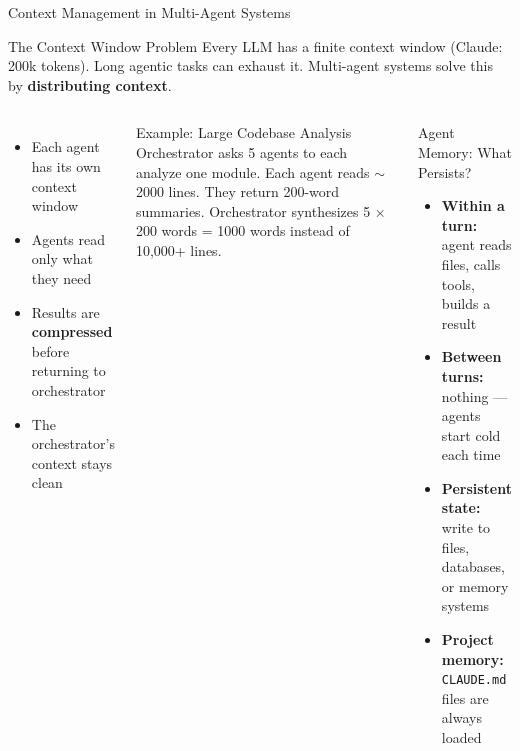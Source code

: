 \documentclass[aspectratio=169,xcolor=dvipsnames]{beamer}
\begin{document}
\begin{frame}{Context Management in Multi-Agent Systems}
    \begin{block}{The Context Window Problem}
        Every LLM has a finite context window (Claude: 200k tokens). Long agentic tasks can exhaust it. Multi-agent systems solve this by \textbf{distributing context}.
    \end{block}

    \begin{columns}
        \begin{itemize}
            \item Each agent has its own context window
            \item Agents read only what they need
            \item Results are \textbf{compressed} before returning to orchestrator
            \item The orchestrator's context stays clean
        \end{itemize}
        \vspace{0.2cm}
        \begin{exampleblock}{Example: Large Codebase Analysis}
            Orchestrator asks 5 agents to each analyze one module. Each agent reads $\sim$2000 lines. They return 200-word summaries. Orchestrator synthesizes 5 × 200 words = 1000 words instead of 10,000+ lines.
        \end{exampleblock}

        \begin{alertblock}{Agent Memory: What Persists?}
            \begin{itemize}
                \item \textbf{Within a turn:} agent reads files, calls tools, builds a result
                \item \textbf{Between turns:} nothing --- agents start cold each time
                \item \textbf{Persistent state:} write to files, databases, or memory systems
                \item \textbf{Project memory:} \texttt{CLAUDE.md} files are always loaded
            \end{itemize}
        \end{alertblock}
    \end{columns}
\end{frame}
\end{document}
